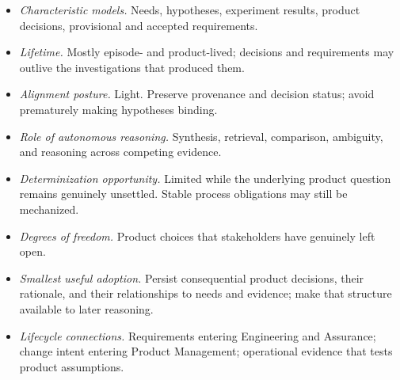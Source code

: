 \begin{itemize}
\tightlist
\item
  \emph{Characteristic models.} Needs, hypotheses, experiment results, product decisions, provisional and accepted requirements.
\item
  \emph{Lifetime.} Mostly episode- and product-lived; decisions and requirements may outlive the investigations that produced them.
\item
  \emph{Alignment posture.} Light. Preserve provenance and decision status; avoid prematurely making hypotheses binding.
\item
  \emph{Role of autonomous reasoning.} Synthesis, retrieval, comparison, ambiguity, and reasoning across competing evidence.
\item
  \emph{Determinization opportunity.} Limited while the underlying product question remains genuinely unsettled. Stable process obligations may still be mechanized.
\item
  \emph{Degrees of freedom.} Product choices that stakeholders have genuinely left open.
\item
  \emph{Smallest useful adoption.} Persist consequential product decisions, their rationale, and their relationships to needs and evidence; make that structure available to later reasoning.
\item
  \emph{Lifecycle connections.} Requirements entering Engineering and Assurance; change intent entering Product Management; operational evidence that tests product assumptions.
\end{itemize}
